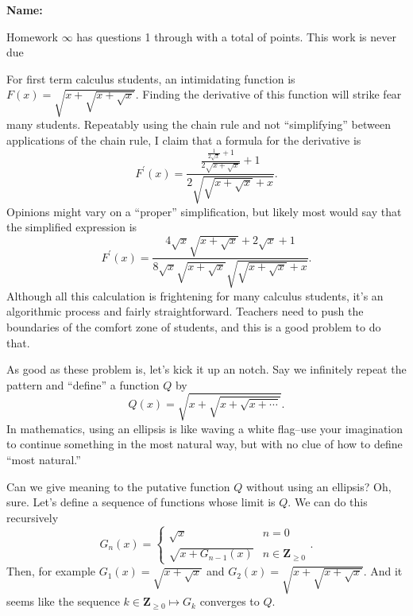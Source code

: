 \documentclass[12pt,fleqn,answers]{exam}
\newcommand{\integers}{\mathbf{Z}}
\newcommand{\quiz}{$\infty$}
\newcommand{\term}{Fall}
\begin{document}
\vspace{0.1in}
\noindent{}
{\bf Name:}  \\
\noindent \makebox[3.0truein][l]{\textbf{Homework \quiz, \term \/ \the\year}}
\vspace{0.1in}

\noindent  Homework \quiz\/  has questions 1 through  \numquestions \/ with a total 
of  \numpoints\/  points. 
This work is never due


\begin{questions}

 \question For first term calculus students, an intimidating function is $F(x) = \sqrt{x + \sqrt{x + \sqrt{x}}}$. Finding the derivative of 
 this function will strike fear many students. Repeatably using the chain rule and not ``simplifying'' between applications of the chain rule, 
  I claim that a formula for the derivative is
\begin{equation*}
F^\prime(x) = \frac{\frac{\frac{1}{2 \sqrt{x}}+1}{2 \sqrt{x+\sqrt{x}}}+1}{2 \sqrt{\sqrt{x+\sqrt{x}}+x}}.
\end{equation*}
Opinions might vary on a ``proper'' simplification, but likely most would say that the simplified expression is
\begin{equation*}
F^\prime(x) = \frac{4 \sqrt{x} \sqrt{x+\sqrt{x}}+2 \sqrt{x}+1}{8 \sqrt{x} \sqrt{x+\sqrt{x}} \sqrt{\sqrt{x+\sqrt{x}}+x}}.
  \end{equation*}
  Although all this calculation is frightening for many calculus students, it's an algorithmic process and fairly straightforward.  Teachers need to push
  the boundaries of the comfort zone of students, and this is a good problem to do that.
  
  
  \quad As good as these problem is, let's kick it up an notch.  Say we infinitely repeat the pattern and ``define''  a function $Q$ by
  \begin{equation*}
 Q(x) = \sqrt{x + \sqrt{x + \sqrt{x + \cdots}}}.
\end{equation*}
In mathematics, using an ellipsis is like waving a white flag--use your imagination to continue something in the most natural way, 
but with no clue of how to define ``most natural.''  

\quad Can we give meaning to the putative function $Q$ without using an ellipsis?  Oh, sure.  Let's define a sequence of functions whose limit
is $Q$.  We can do this recursively
\begin{equation*}
   G_{n}(x) = \begin{cases}  \sqrt{x}  & n = 0 \\ \sqrt{x + G_{n-1}(x)}  & n \in \integers_{\geq 0} \end{cases}.
\end{equation*}
Then, for example $G_1(x) = \sqrt{x+\sqrt{x}}$ and $G_2(x) = \sqrt{x+\sqrt{x + \sqrt{x}}}$.   And it seems like
the sequence $k \in \integers_{\geq 0} \mapsto G_k$ converges to $Q$.


\end{questions}
\end{document}
